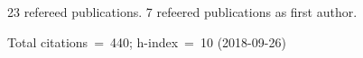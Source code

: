 23 refereed publications. 7 refeered publications as first author.

               Total citations~=~440; h-index~=~10 (2018-09-26)